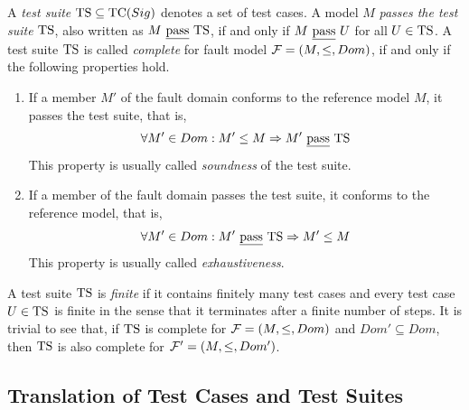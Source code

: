 A \emph{test suite} ${\text{TS}} \subseteq {\text{TC}}(Sig)$ denotes  a set of test cases.
A model $M$ \emph{passes the test suite} ${\text{TS}}$, also written as $M\ \underline{\text{pass}}\ {\text{TS}}$,
if and only if $M\ \underline{\text{pass}}\ U$ for all $U\in {\text{TS}}$. A test suite ${\text{TS}}$ is called \emph{complete} for fault model ${\cal F} = (M,\le,Dom)$, if and only if the following properties hold.
\begin{enumerate}
\item If a member $M'$ of the fault domain  conforms to the reference model $M$, 
it passes the test suite, that is,
$$
\forall M'\in Dom: M'\le M \Rightarrow M'\ \underline{\text{pass}}\ {\text{TS}}
$$
This property is usually called \emph{soundness} of the test suite.

\item If a member of the fault domain passes the test suite, it conforms to the reference model, that is,
$$
\forall M'\in Dom: M'\ \underline{\text{pass}}\ {\text{TS}} \Rightarrow M'\le M
$$
This property is usually called \emph{exhaustiveness}.
\end{enumerate}
A test suite ${\text{TS}}$ is \emph{finite} if it contains finitely many test cases and every test
case $U\in{\text{TS}}$ is finite in the sense that it terminates after a finite number of steps.
It is trivial to see that, if ${\text{TS}}$ is complete  for   ${\cal F} = (M,\le,Dom)$
and $Dom'\subseteq Dom$, then ${\text{TS}}$ is also complete for ${\cal F}' = (M,\le,Dom')$.



\subsection{Translation of Test Cases and Test Suites}
\label{sec:transltt}


